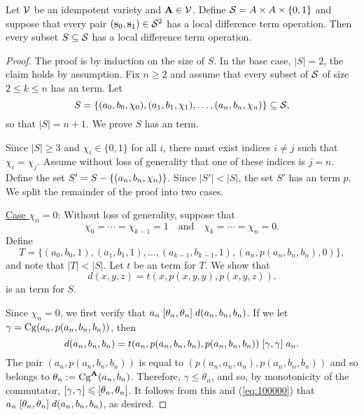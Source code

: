 \begin{theorem} %
  \label{thm:local-diff-terms}
  Let $\mathcal{V}$ be an idempotent variety and
  $\mathbf{A} \in \mathcal{V}$. Define
  $\mathcal{S}= A \times A \times \{0,1\}$
  and suppose that every pair
  $(\mathbf{s}_0, \mathbf{s}_1) \in \mathcal{S}^2$
  has a local difference term operation.
  Then every subset $S \subseteq \mathcal{S}$
  has a local difference term operation.
\end{theorem}

\begin{proof}

The proof is by induction on the size of $S$.  In the base case, $|S| = 2$,
the claim holds by assumption.
Fix $n\geq 2$ and assume that every subset of $\mathcal{S}$ of size $2\leq k \leq n$
has an \ld term. Let
\[
S = \{(a_0, b_0, \chi_0), (a_1, b_1, \chi_1), \dots, 
        (a_{n}, b_{n},\chi_{n})\} \subseteq \mathcal{S},
\]
so that $|S| = n+1$.  We prove $S$ has an \ld term.

Since $|S| \geq 3$ and $\chi_i \in \{0,1\}$ for all $i$, there must exist
indices $i\neq j$ such that $\chi_i = \chi_j$. Assume without loss of
generality that one of these indices is $j=n$.  
Define the set $S' = S - \{(a_n, b_n, \chi_n)\}$.
Since $|S'| < |S|$, the set $S'$ has an \ld term $p$.
We split the remainder of the proof into two cases.

\medskip

\noindent \underline{Case $\chi_n = 0$}:
Without loss of generality, suppose that 
\begin{equation*}
  \chi_0 = %
\cdots =\chi_{k-1} = 1 \quad \text{and} \quad
\chi_{k} = \cdots = \chi_{n} = 0.
\end{equation*} 
Define %
\[T = \{(a_0, b_0, 1), (a_1, b_1, 1),
\dots, (a_{k-1}, b_{k-1}, 1), (a_n, p(a_n, b_n, b_n), 0)\},\] and
note that $|T| < |S|$.
Let $t$ be an \ld term for $T$.
We show that 
\[
d(x,y,z) = t(x, p(x,y,y), p(x,y,z)).
\]
is an \ld term for $S$.

Since $\chi_n =0$, we first verify that
$a_n \mathrel{[\theta_n, \theta_n]} d(a_n,b_n,b_n)$.
If we let $\gamma = \operatorname{Cg}(a_n, p(a_n,b_n,b_n))$, then
\begin{equation}
    \label{eq:100000}
  d(a_n,b_n,b_n) =
  t(a_n, p(a_n,b_n,b_n), p(a_n,b_n,b_n))\mathrel{[\gamma, \gamma]} a_n.
\end{equation}
The pair $(a_n, p(a_n,b_n,b_n))$ is equal to
$(p(a_n,a_n,a_n), p(a_n,b_n,b_n))$ and so 
belongs to $\theta_n:= \operatorname{Cg}^{\mathbf{A}}(a_n, b_n)$.
Therefore, $\gamma\leq \theta_n$, and so,
by monotonicity of the commutator,
$[\gamma, \gamma] \leqslant [\theta_n, \theta_n]$.
It follows from this and (\ref{eq:100000}) that
$a_n \mathrel{[\theta_n, \theta_n]} d(a_n,b_n,b_n)$, as desired.


\end{proof}
